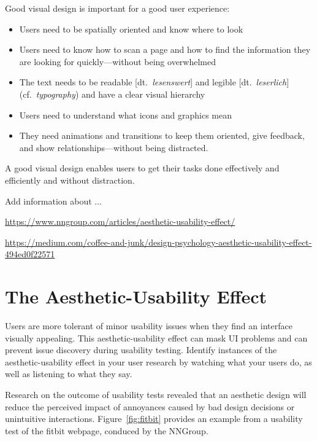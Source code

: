 \noindent Good visual design is important for a good user experience:
\begin{itemize}
	\item Users need to be spatially oriented and know where to look
	\item Users need to know how to scan a page and how to find the information they are looking for quickly---without being overwhelmed 
	\item The text needs to be readable [dt.~\emph{lesenswert}] and legible [dt.~\emph{leserlich}] (cf.~\emph{typography}) and have a clear visual hierarchy
	\item Users need to understand what icons and graphics mean
	\item They need animations and transitions to keep them oriented, give feedback, and show relationships---without being distracted.
\end{itemize}
A good visual design enables users to get their tasks done effectively and efficiently and without distraction. 


\begin{tcolorbox}[
	width=\textwidth,
	title={\textbf{Excursus: What is the Aesthetic-Usability Effect?}},
	outer arc=0mm,
	arc=0mm,
	boxrule=1pt,
	]    
Add information about ...
\par \url{https://www.nngroup.com/articles/aesthetic-usability-effect/} 
\par \url{https://medium.com/coffee-and-junk/design-psychology-aesthetic-usability-effect-494ed0f22571}
\end{tcolorbox}


\section{The Aesthetic-Usability Effect} %
\label{sub:aesthetic-usability_effect}

Users are more tolerant of minor usability issues when they find an interface visually appealing. This aesthetic-usability effect can mask UI problems and can prevent issue discovery during usability testing. Identify instances of the aesthetic-usability effect in your user research by watching what your users do, as well as listening to what they say.

Research on the outcome of usability tests revealed that an aesthetic design will reduce the perceived impact of annoyances caused by bad design decisions or unintuitive interactions. Figure~\ref{fig:fitbit} provides an example from a usability test of the fitbit webpage, conduced by the NNGroup.

